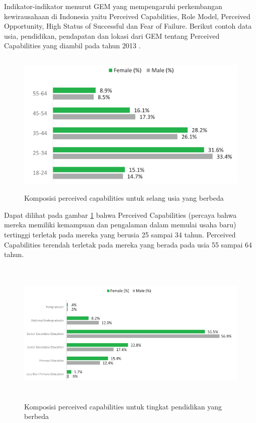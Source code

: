 Indikator-indikator menurut GEM yang mempengaruhi perkembangan kewirausahaan di Indonesia yaitu Perceived Capabilities, Role Model, Perceived Opportunity, High Status of Successful dan Fear of Failure. Berikut contoh data usia, pendidikan, pendapatan dan lokasi dari GEM tentang Perceived Capabilities yang diambil pada tahun 2013 \cite{dataGEM}.


\begin{figure} [H]
	\centering  
	\includegraphics[width=14cm, height=7cm]{umurPC2013} 
	\caption[Komposisi perceived capabilities untuk selang usia yang berbeda]{Komposisi perceived capabilities untuk selang usia yang berbeda} 
	\label{fig:PCUmur} 
\end{figure}

Dapat dilihat pada gambar \ref{fig:PCUmur} bahwa Perceived Capabilities (percaya bahwa mereka memiliki kemampuan dan pengalaman dalam memulai usaha baru) tertinggi terletak pada mereka yang berusia 25 sampai 34 tahun. Perceived Capabilities terendah terletak pada mereka yang berada pada usia 55 sampai 64 tahun.

\begin{figure} [H]
	\centering  
	\includegraphics[width=14cm, height=7cm]{pendidikanPC2013} 
	\caption[Komposisi perceived capabilities untuk tingkat pendidikan yang berbeda]{Komposisi perceived capabilities untuk tingkat pendidikan yang berbeda} 
	\label{fig:PCPendidikan} 
\end{figure}


